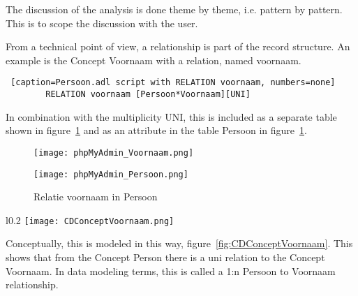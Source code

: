 The discussion of the analysis is done theme by theme, i.e. pattern by pattern.
This is to scope the discussion with the user.

From a technical point of view, a relationship is part of the record structure.
An example is the Concept Voornaam with a relation, named \mbox{voornaam}.

\begin{lstlisting} [caption=Persoon.adl script with RELATION voornaam, numbers=none]
        RELATION voornaam [Persoon*Voornaam][UNI]
\end{lstlisting}
In combination with the multiplicity UNI, this is included as a separate table shown in figure~\ref{Fig:voornaam-in-persoon} and as an attribute in the table Persoon in figure~\ref{Fig:voornaam-in-persoon}.
\begin{figure}[!htb]
   \begin{minipage}{0.48\textwidth}
       \texttt{[image: phpMyAdmin\_Voornaam.png]}
       \caption{Concept Voornaam}\label{concept-voornaam}
   \end{minipage}\hfill
   \begin{minipage}{0.48\textwidth}
       \texttt{[image: phpMyAdmin\_Persoon.png]}
       \caption{Relatie voornaam in Persoon}\label{Fig:voornaam-in-persoon}
   \end{minipage}
\end{figure}

\begin{wrapfigure}{l}{0.2\textwidth}
    \texttt{[image: CDConceptVoornaam.png]} 
    \caption{\label{fig:CDConceptVoornaam}CDConceptVoornaam}
\end{wrapfigure}
Conceptually, this is modeled in this way, figure~\ref{fig:CDConceptVoornaam}.
This shows that from the Concept Person there is a \acrlong{uni} relation to the Concept Voornaam.
In data modeling terms, this is called a 1:n Persoon to Voornaam relationship.

